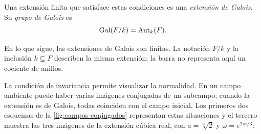 \begin{defi}
Una extensión finita que satisface estas condiciones es una \emph{extensión de Galois}. Su \emph{grupo de Galois} es
\[
\operatorname{Gal}(F/k)=\operatorname{Aut}_k(F).
\]
\end{defi}
En lo que sigue, las extensiones de Galois son finitas. La notación $F/k$ y la inclusión $k\subseteq F$ describen la misma extensión; la barra no representa aquí un cociente de anillos.

La condición de invariancia permite visualizar la normalidad. En un campo ambiente puede haber varias imágenes conjugadas de un subcampo; cuando la extensión es de Galois, todas coinciden con el campo inicial. Los primeros dos esquemas de la \cref{fig:campos-conjugados} representan estas situaciones y el tercero muestra las tres imágenes de la extensión cúbica real, con $a=\sqrt[3]{2}$ y $\omega=e^{2\pi i/3}$:
